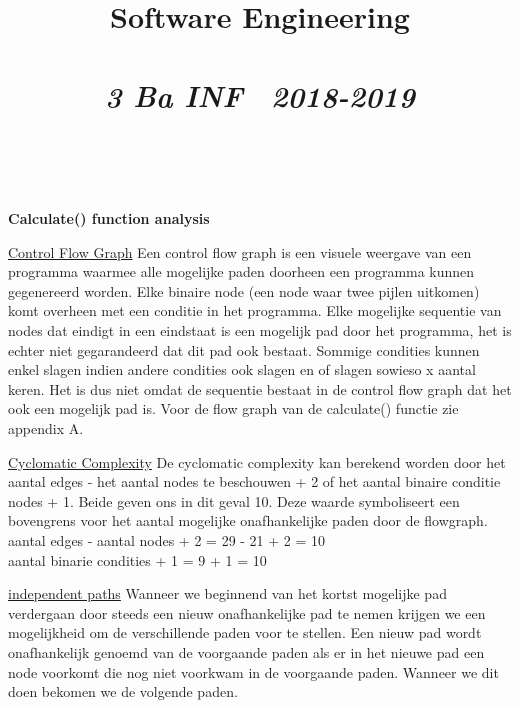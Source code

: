 \documentclass{article}
\title{\textmd{\textbf{Software Engineering}}\\\normalsize\vspace{0.1in}\Large{\assignmentname}\\\vspace{0.1in}\small{\textit{3 Ba INF \  2018-2019}}}
\author{\studentA \\ \studentB}
\begin{document}
\maketitle
\noindent
\textbf{Calculate() function analysis} \newline
\newline
\maketitle
\noindent
\underline{Control Flow Graph}\newline
\newline
Een control flow graph is een visuele weergave van een programma waarmee alle mogelijke paden doorheen een programma kunnen gegenereerd worden. Elke binaire node (een node waar twee pijlen uitkomen) komt overheen met een conditie in het programma. Elke mogelijke sequentie van nodes dat eindigt in een eindstaat is een mogelijk pad door het programma, het is echter niet gegarandeerd dat dit pad ook bestaat. Sommige condities kunnen enkel slagen indien andere condities ook slagen en of slagen sowieso x aantal keren. Het is dus niet omdat de sequentie bestaat in de control flow graph dat het ook een mogelijk pad is. Voor de flow graph van de calculate() functie zie appendix A. \\
\newline
\maketitle
\noindent
\underline{Cyclomatic Complexity}\newline
\newline
De cyclomatic complexity kan berekend worden door het aantal edges - het aantal nodes te beschouwen + 2 of het aantal binaire conditie nodes + 1. Beide geven ons in dit geval 10. Deze waarde symboliseert een bovengrens voor het aantal mogelijke onafhankelijke paden door de flowgraph. \\
aantal edges - aantal nodes + 2 = 29 - 21 + 2 = 10 \\
aantal binarie condities + 1 = 9 + 1 = 10 \\

\newpage
\maketitle
\noindent
\underline{independent paths}\newline
\newline
Wanneer we beginnend van het kortst mogelijke pad verdergaan door steeds een nieuw onafhankelijke pad te nemen krijgen we een mogelijkheid om de verschillende paden voor te stellen. Een nieuw pad wordt onafhankelijk genoemd van de voorgaande paden als er in het nieuwe pad een node voorkomt die nog niet voorkwam in de voorgaande paden. Wanneer we dit doen bekomen we de volgende paden. \\
\end{document}
